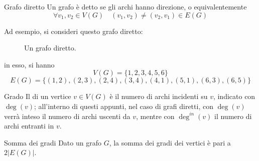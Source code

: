 \documentclass[a4paper, 12pt]{report}
\begin{document}
    \begin{frameddefn}{Grafo diretto}
        Un grafo è detto  se gli archi hanno direzione, o equivalentemente $$\forall v_1, v_2 \in V(G) \quad (v_1, v_2) \neq (v_2, v_1) \in E(G)$$
    \end{frameddefn}

    \begin{example}
        Ad esempio, si consideri questo grafo diretto:

        \begin{figure}[H]
            \centering
            \caption{Un grafo diretto.}
        \end{figure}

        in esso, si hanno $$V(G) = \{1, 2, 3, 4, 5, 6\}$$ $$E(G) = \{(1, 2), (2, 3), (2, 4), (3, 4), (4, 1), (5, 1), (6, 3), (6, 5)\}$$
    \end{example}

    \begin{frameddefn}{Grado}
        Il  di un vertice $v \in V(G)$ è il numero di archi incidenti su $v$, indicato con $\deg(v)$; all'interno di questi appunti, nel caso di grafi diretti, con $\deg(v)$ verrà inteso il numero di archi uscenti da $v$, mentre con $\deg^{in}(v)$ il numero di archi entranti in $v$.
    \end{frameddefn}

    \begin{framedlem}[label={Somma dei gradi}]{Somma dei gradi}
        Dato un grafo $G$, la somma dei gradi dei vertici è pari a $2 |E(G)|$.
    \end{framedlem}
\end{document}
